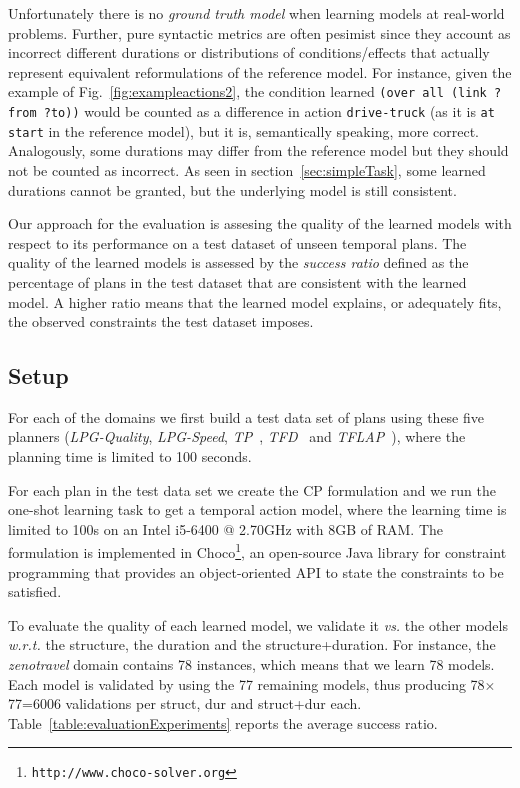 \documentclass[runningheads]{llncs}
\begin{document}
Unfortunately there is no {\em ground truth model} when learning models at real-world problems. Further, pure syntactic metrics are often pesimist since they account as incorrect different durations or distributions of conditions/effects that actually represent equivalent reformulations of the reference model. For instance, given the example of Fig.~\ref{fig:exampleactions2}, the condition learned \texttt{(over all (link ?from ?to))} would be counted as a difference in action \texttt{drive-truck} (as it is \texttt{at start} in the reference model), but it is, semantically speaking, more correct. Analogously, some durations may differ from the reference model but they should not be counted as incorrect. As seen in section~\ref{sec:simpleTask}, some learned durations cannot be granted, but the underlying model is still consistent. 

Our approach for the evaluation is assesing the quality of the learned models with respect to its performance on a test dataset of unseen temporal plans. The quality of the learned models is assessed by the {\em success ratio} defined as the percentage of plans in the test dataset that are consistent with the learned model. A higher ratio means that the learned model explains, or adequately fits, the observed constraints the test dataset imposes.

\subsection{Setup}
For each of the domains we first build a test data set of plans using these five planners (\textit{LPG-Quality}, \textit{LPG-Speed}\cite{gerevini2003planning}, \textit{TP}~\cite{jimenez2015temporal}, \textit{TFD}~\cite{eyerich2009using} and \textit{TFLAP}~\cite{marzal2016temporal}), where the planning time is limited to 100 seconds.

For each plan in the test data set we create the CP formulation and we run the one-shot learning task to get a temporal action model, where the learning time is limited to 100s on an Intel i5-6400 @ 2.70GHz with 8GB of RAM. The formulation is implemented in \textsf{Choco}\footnote{\texttt{http://www.choco-solver.org}}, an open-source Java library for constraint programming that provides an object-oriented API to state the constraints to be satisfied.

To evaluate the quality of each learned model, we validate it \emph{vs.} the other models \emph{w.r.t.} the structure, the duration and the structure+duration. For instance, the \emph{zenotravel} domain contains 78 instances, which means that we learn 78 models. Each model is validated by using the 77 remaining models, thus producing 78$\times$77=6006 validations per struct, dur and struct+dur each. Table~\ref{table:evaluationExperiments} reports the average success ratio.
\end{document}
